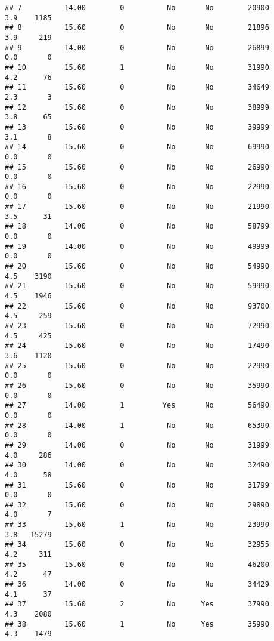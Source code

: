 \documentclass[
]{article}
\begin{document}
\begin{verbatim}
## 7          14.00        0          No       No        20900         3.9    1185
## 8          15.60        0          No       No        21896         3.9     219
## 9          14.00        0          No       No        26899         0.0       0
## 10         15.60        1          No       No        31990         4.2      76
## 11         15.60        0          No       No        34649         2.3       3
## 12         15.60        0          No       No        38999         3.8      65
## 13         15.60        0          No       No        39999         3.1       8
## 14         15.60        0          No       No        69990         0.0       0
## 15         15.60        0          No       No        26990         0.0       0
## 16         15.60        0          No       No        22990         0.0       0
## 17         15.60        0          No       No        21990         3.5      31
## 18         14.00        0          No       No        58799         0.0       0
## 19         14.00        0          No       No        49999         0.0       0
## 20         15.60        0          No       No        54990         4.5    3190
## 21         15.60        0          No       No        59990         4.5    1946
## 22         15.60        0          No       No        93700         4.5     259
## 23         15.60        0          No       No        72990         4.5     425
## 24         15.60        0          No       No        17490         3.6    1120
## 25         15.60        0          No       No        22990         0.0       0
## 26         15.60        0          No       No        35990         0.0       0
## 27         14.00        1         Yes       No        56490         0.0       0
## 28         14.00        1          No       No        65390         0.0       0
## 29         14.00        0          No       No        31999         4.0     286
## 30         14.00        0          No       No        32490         4.0      58
## 31         15.60        0          No       No        31799         0.0       0
## 32         15.60        0          No       No        29890         4.0       7
## 33         15.60        1          No       No        23990         3.8   15279
## 34         15.60        0          No       No        32955         4.2     311
## 35         15.60        0          No       No        46200         4.2      47
## 36         14.00        0          No       No        34429         4.1      37
## 37         15.60        2          No      Yes        37990         4.3    2080
## 38         15.60        1          No      Yes        35990         4.3    1479

\end{verbatim}
\end{document}

